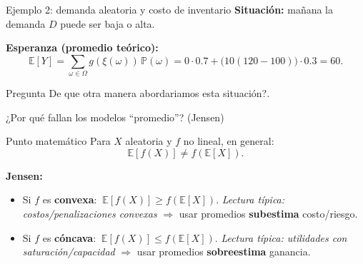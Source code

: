 \documentclass[aspectratio=1610, 9pt]{beamer}
\begin{document}
\begin{frame}{Ejemplo 2:  demanda aleatoria y costo de inventario}
\textbf{Situación:} mañana la demanda $D$ puede ser baja o alta.

\medskip
\textbf{Esperanza (promedio teórico):}
\[
\mathbb E[Y]=\sum_{\omega\in\Omega} g(\xi(\omega))\,\mathbb P(\omega)
=0\cdot 0.7 + \big(10(120-100)\big)\cdot 0.3 = 60.
\]

\begin{block}{Pregunta}
De que otra manera abordariamos esta situación?.
\end{block}
\end{frame}



\begin{frame}{¿Por qué fallan los modelos “promedio”? (Jensen)}
\begin{alertblock}{Punto matemático}
Para $X$ aleatoria y $f$ no lineal, en general:
\[
\mathbb E[f(X)] \neq f(\mathbb E[X]).
\]
\end{alertblock}

\textbf{Jensen:}
\begin{itemize}
  \item Si $f$ es \textbf{convexa}: $\ \mathbb E[f(X)] \ge f(\mathbb E[X])$.
    \newline
    \emph{Lectura típica: costos/penalizaciones convexas} $\Rightarrow$ usar promedios \textbf{subestima} costo/riesgo.
  \item Si $f$ es \textbf{cóncava}: $\ \mathbb E[f(X)] \le f(\mathbb E[X])$.
    \newline
    \emph{Lectura típica: utilidades con saturación/capacidad} $\Rightarrow$ usar promedios \textbf{sobreestima} ganancia.
\end{itemize}
\end{frame}
\end{document}
